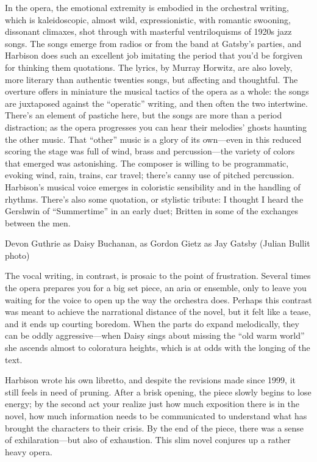 In the opera, the emotional extremity is embodied in the orchestral writing, which is kaleidoscopic, almost wild, expressionistic, with romantic swooning, dissonant climaxes, shot through with masterful ventriloquisms of 1920s jazz songs. The songs emerge from radios or from the band at Gatsby’s parties, and Harbison does such an excellent job imitating the period that you’d be forgiven for thinking them quotations. The lyrics, by Murray Horwitz, are also lovely, more literary than authentic twenties songs, but affecting and thoughtful. The overture offers in miniature the musical tactics of the opera as a whole: the songs are juxtaposed against the “operatic” writing, and then often the two intertwine. There’s an element of pastiche here, but the songs are more than a period distraction; as the opera progresses you can hear their melodies’ ghosts haunting the other music. That “other” music is a glory of its own—even in this reduced scoring the stage was full of wind, brass and percussion—the variety of colors that emerged was astonishing. The composer is willing to be programmatic, evoking wind, rain, trains, car travel; there’s canny use of pitched percussion. Harbison’s musical voice emerges in coloristic sensibility and in the handling of rhythms. There’s also some quotation, or stylistic tribute: I thought I heard the Gershwin of “Summertime” in an early duet; Britten in some of the exchanges between the men.

Devon Guthrie as Daisy Buchanan, as Gordon Gietz as Jay Gatsby (Julian Bullit photo)

The vocal writing, in contrast, is prosaic to the point of frustration. Several times the opera prepares you for a big set piece, an aria or ensemble, only to leave you waiting for the voice to open up the way the orchestra does. Perhaps this contrast was meant to achieve the narrational distance of the novel, but it felt like a tease, and it ends up courting boredom. When the parts do expand melodically, they can be oddly aggressive—when Daisy sings about missing the “old warm world” she ascends almost to coloratura heights, which is at odds with the longing of the text.

Harbison wrote his own libretto, and despite the revisions made since 1999, it still feels in need of pruning. After a brisk opening, the piece slowly begins to lose energy; by the second act your realize just how much exposition there is in the novel, how much information needs to be communicated to understand what has brought the characters to their crisis. By the end of the piece, there was a sense of exhilaration—but also of exhaustion. This slim novel conjures up a rather heavy opera.

